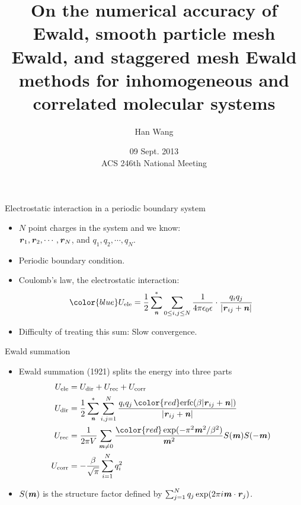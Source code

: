 \documentclass{beamer}
\newcommand{\redc}[1]{{\color{red} #1}}
\newcommand{\bluec}[1]{{\color{blue} #1}}
\newcommand{\vect}[1]{\textbf{\textit{#1}}}
\begin{document}
\title[Error estimates of Ewald, SPME \& StME]{
  On the numerical accuracy of Ewald, smooth particle mesh Ewald, and staggered mesh Ewald methods for inhomogeneous and correlated molecular systems
}
\author{Han Wang}
\date[Sept. 2013]{09 Sept. 2013\\ACS 246th National Meeting}
\frame{\titlepage}

\begin{frame}{Electrostatic interaction in a periodic boundary system}
  \begin{itemize}
    \vfill
  \item<1-> \bluec{$N$} point charges in the system and we know:\\
    \bluec{$\vect r_1, \vect r_2, \cdots, \vect r_N$}, and
    \bluec{$q_1, q_2, \cdots, q_N$}.
    \vfill
  \item <2-> Periodic boundary condition.
    \vfill
  \item <3-> Coulomb's law, the electrostatic interaction:
    \begin{equation*}\bluec{
        U_{\textrm{ele}} =
        \frac12 \sum^\ast_{\vect n}\sum_{0\leq i,j\leq N}
        \frac{1}{4\pi\epsilon_0\epsilon}\cdot
        \frac{q_i q_j}{\vert \vect r_{ij} + \vect n\vert}}
    \end{equation*}
    \vfill
  \item <4-> Difficulty of treating this sum: Slow convergence.
    \vfill
  \end{itemize}  
\end{frame}

\begin{frame}{Ewald summation}
  \begin{itemize}
  \item <1->
    Ewald summation (1921) splits the
    energy into three parts
    \bluec{
      \begin {align*}
        U_{\textrm{ele}} &=  U_{\textrm{dir}} + U_{\textrm{rec}}+ U_{\textrm{corr}}\\
        U_{\textrm{dir}} & = \frac12 \sum^{\ast}_{\vect n}
        \sum_{i,j = 1}^{N} \frac{q_iq_j\, \redc{\textrm{erfc}(\beta \vert\vect{r}_{ij} + \vect{n}\vert)}}
        {\vert\vect{r}_{ij} + \vect{n}\vert} \\ 
        U_{\textrm{rec}} & = \frac1{2\pi V} \sum_{\vect m \neq 0}
        \frac{\redc{\exp(-\pi^2\vect m^2 / \beta^2)}}{\vect m^2} S(\vect m) S(-\vect m) \\
        U_{\textrm{corr}}& = -\frac\beta{\sqrt \pi} \sum_{i=1}^N q_i^2
      \end {align*}}
  \item<2-> \bluec{$S(\vect m)$} is the structure factor
    defined by \bluec{
      $\sum_{j=1}^N q_j \exp (2 \pi i \vect m \cdot \vect r_j)$.}
  \end{itemize}
\end{frame}
\end{document}
